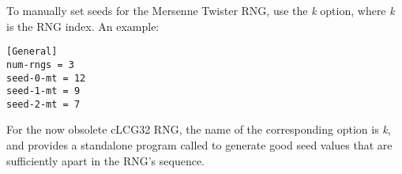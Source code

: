 To manually set seeds for the Mersenne Twister RNG, use the \textit{k}
option, where \textit{k} is the RNG index. An example:

\begin{verbatim}
[General]
num-rngs = 3
seed-0-mt = 12
seed-1-mt = 9
seed-2-mt = 7
\end{verbatim}

For the now obsolete cLCG32 RNG, the name of the corresponding option is
\textit{k}, and {\opp} provides a standalone program
called  to generate good seed values that
are sufficiently apart in the RNG's sequence.


